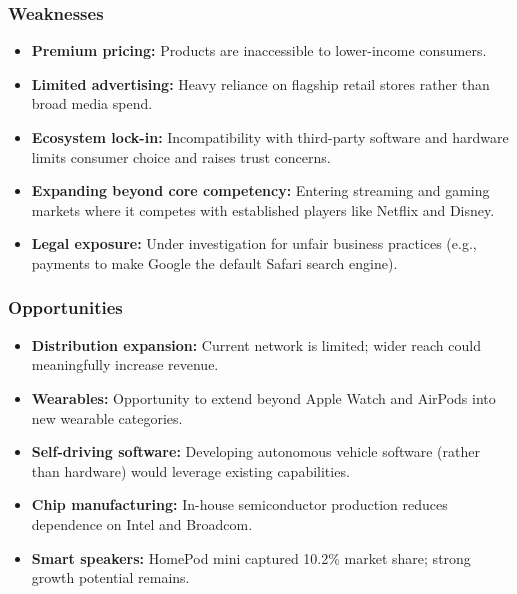 \documentclass[11pt, letterpaper]{article}
\begin{document}
\subsubsection{Weaknesses}
\begin{itemize}[leftmargin=*]
  \item \textbf{Premium pricing:} Products are inaccessible to lower-income consumers.
  \item \textbf{Limited advertising:} Heavy reliance on flagship retail stores rather than broad media spend.
  \item \textbf{Ecosystem lock-in:} Incompatibility with third-party software and hardware limits consumer choice and raises trust concerns.
  \item \textbf{Expanding beyond core competency:} Entering streaming and gaming markets where it competes with established players like Netflix and Disney.
  \item \textbf{Legal exposure:} Under investigation for unfair business practices (e.g., payments to make Google the default Safari search engine).
\end{itemize}

\subsubsection{Opportunities}
\begin{itemize}[leftmargin=*]
  \item \textbf{Distribution expansion:} Current network is limited; wider reach could meaningfully increase revenue.
  \item \textbf{Wearables:} Opportunity to extend beyond Apple Watch and AirPods into new wearable categories.
  \item \textbf{Self-driving software:} Developing autonomous vehicle software (rather than hardware) would leverage existing capabilities.
  \item \textbf{Chip manufacturing:} In-house semiconductor production reduces dependence on Intel and Broadcom.
  \item \textbf{Smart speakers:} HomePod mini captured 10.2\% market share; strong growth potential remains.
\end{itemize}
\end{document}
